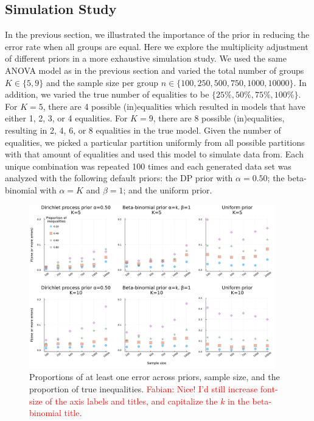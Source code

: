 \documentclass[11pt,a4paper]{article}
\theoremstyle{definition} %
\theoremstyle{case}
\newcommand{\FD}[1]{\textcolor{red}{Fabian: #1 }}
\begin{document}
\subsection{Simulation Study} \label{sec:simulation}
In the previous section, we illustrated the importance of the prior in reducing the error rate when all groups are equal. Here we explore the multiplicity adjustment of different priors in a more exhaustive simulation study. We used the same ANOVA model as in the previous section and varied the total number of groups $K \in \{5, 9\}$ and the sample size per group $n \in \{100, 250, 500, 750, 1000, 10000\}$. In addition, we varied the true number of equalities to be $\{25\%, 50\%, 75\%, 100\%\}$. For $K = 5$, there are 4 possible (in)equalities which resulted in models that have either 1, 2, 3, or 4 equalities. For $K = 9$, there are 8 possible (in)equalities, resulting in 2, 4, 6, or 8 equalities in the true model. Given the number of equalities, we picked a particular partition uniformly from all possible partitions with that amount of equalities and used this model to simulate data from. Each unique combination was repeated 100 times and each generated data set was analyzed with the following default priors: the DP prior with $\alpha = 0.50$; the beta-binomial with $\alpha = K$ and $\beta = 1$; and the uniform prior. 

\begin{figure}
    \centering
    \includegraphics[width=0.95\textwidth]{figures/simulation_results_test_clean_figures/simulation_manuscript.pdf}
    \caption{Proportions of at least one error across priors, sample size, and the proportion of true inequalities. \FD{Nice! I'd still increase font-size of the axis labels and titles, and capitalize the $k$ in the beta-binomial title.}}
    \label{fig:big_simulation}
\end{figure}
\end{document}
